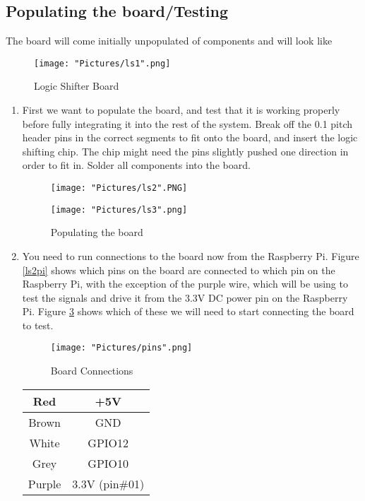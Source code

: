 \documentclass[12pt]{article}
\begin{document}
\subsection{Populating the board/Testing}

The board will come initially unpopulated of components and will look like

\begin{figure}[H]
  	\centering
    	\texttt{[image: "Pictures/ls1".png]}
 	\caption{Logic Shifter Board}
	\label{ls1}
\end{figure}

\begin{enumerate}

	\item First we want to populate the board, and test that it is working properly before fully integrating it into the rest of the system. Break off the 0.1 pitch header pins in the correct segments to fit onto the board, and insert the logic shifting chip. The chip might need the pins slightly pushed one direction in order to fit in. Solder all components into the board.

\begin{figure}[H]
 	\centering
  	\begin{minipage}[b]{0.45\textwidth}
		\texttt{[image: "Pictures/ls2".PNG]}
  	\end{minipage}
  	\hfill
  	\begin{minipage}[b]{0.45\textwidth}
    		\texttt{[image: "Pictures/ls3".png]}
  	\end{minipage}
	\caption{Populating the board}
	\label{ls2}
\end{figure}

	\item You need to run connections to the board now from the Raspberry Pi. Figure \ref{ls2pi} shows which pins on the board are connected to which pin on the Raspberry Pi, with the exception of the purple wire, which will be using to test the signals and drive it from the 3.3V DC power pin on the Raspberry Pi. Figure \ref{ls4} shows which of these we will need to start connecting the board to test.

\begin{figure}[H]
  	\centering
    	\texttt{[image: "Pictures/pins".png]}
 	\caption{Board Connections}
	\label{ls4}
\end{figure}

\begin{center}
\begin{tabular}[2]{| c | c |}	
	\hline
	Red & +5V \\ \hline
	Brown & GND \\ \hline
	White & GPIO12 \\ \hline
	Grey & GPIO10 \\ \hline
	Purple & 3.3V (pin\#01) \\ \hline
\end{tabular}	
\end{center}


\end{enumerate}
\end{document}

